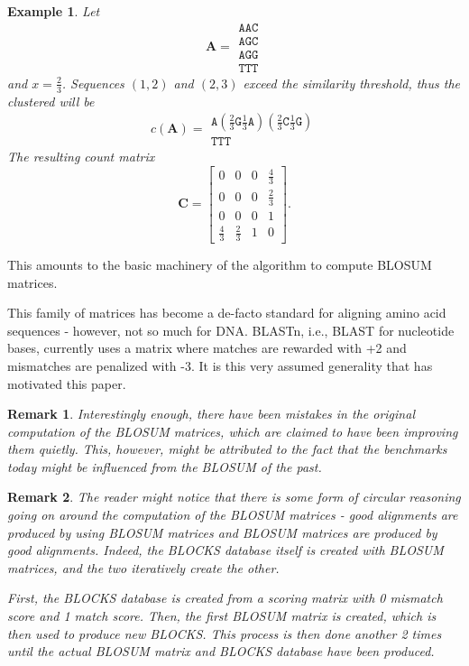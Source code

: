 \documentclass{article}
\newtheorem{example}{Example}
\newtheorem{remark}{Remark}
\begin{document}
\begin{example}
	Let
	\begin{equation*}
		\mathbf A = \begin{matrix}
			\mathtt{AAC} \\
			\mathtt{AGC} \\
			\mathtt{AGG} \\
			\mathtt{TTT}
		\end{matrix}	
	\end{equation*}
	and $x = \frac 2 3$. Sequences $(1, 2)$ and $(2, 3)$ exceed the similarity threshold,
	thus the clustered  will be
	\begin{equation*}
		c(\mathbf A) = \begin{matrix}
		\mathtt{A}(\frac 2 3 \mathtt G \frac 1 3 \mathtt A)(\frac 2 3 \mathtt C \frac 1 3 \mathtt G) \\	
		\mathtt{TTT}
		\end{matrix} 	
	\end{equation*}
	The resulting count matrix 
	\begin{equation*}
			\mathbf C = \begin{bmatrix}
			0 & 0 & 0 & \frac 4 3 \\
			0 & 0 & 0 & \frac 2 3 \\
			0 & 0 & 0 & 1 \\
			\frac 4 3 & \frac 2 3 & 1 & 0
		\end{bmatrix}.
	\end{equation*}
\end{example}
This amounts to the basic machinery of the algorithm to compute BLOSUM matrices.

This family of matrices has become a de-facto standard for aligning amino acid
sequences - however, not so much for DNA. BLASTn, i.e., BLAST for nucleotide bases, currently uses a matrix where
matches are rewarded with +2 and mismatches are penalized with -3. It is this very assumed generality that has motivated this paper.

\begin{remark}
Interestingly enough, there have been
mistakes in the original computation of the BLOSUM matrices, which are claimed
to have been improving them quietly. This, however, might be attributed to the
fact that the benchmarks today might be influenced from the BLOSUM of the past.

\end{remark}

\begin{remark}\label{emref}
	The reader might notice that there is some form of circular reasoning going on around
	the computation of the BLOSUM matrices - good alignments are produced by using BLOSUM 
	matrices and BLOSUM matrices are produced by good alignments. Indeed, the BLOCKS database
	itself is created with BLOSUM matrices, and the two iteratively create the other.

	First, the BLOCKS database is created from a scoring matrix with 0 mismatch score and 1 match score. Then, the first BLOSUM matrix is created, which is then used to produce new BLOCKS. This process is then done another 2 times until the actual BLOSUM matrix and BLOCKS database have been produced.
\end{remark}
\end{document}
